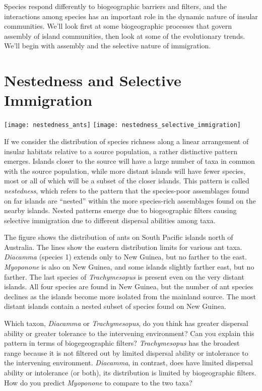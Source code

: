 \documentclass[letterpaper]{tufte-handout}
\begin{document}
Species respond differently to biogeographic barriers and filters, and the interactions among species has an important role in the dynamic nature of insular communities.  We'll look first at some biogeographic processes that govern assembly of island communities, then look at some of the evolutionary trends.  We'll begin with assembly and the selective nature of immigration.

\section{Nestedness and Selective Immigration}
\begin{marginfigure}%
	\texttt{[image: nestedness\_ants]}
	\texttt{[image: nestedness\_selective\_immigration]}
\end{marginfigure} 

If we consider the distribution of species richness along a linear arrangement of insular habitats relative to a source population, a rather distinctive pattern emerges. Islands closer to the source will have a large number of taxa in common with the source population, while more distant islands will have fewer species, most or all of which will be a subset of the closer islands. This pattern is called \textit{nestedness}, which refers to the pattern that the species-poor assemblages found on far islands are ``nested'' within the more species-rich assemblages found on the nearby islands. Nested patterns emerge due to biogeographic filters causing selective immigration due to different dispersal abilities among taxa.

The figure shows the distribution of ants on South Pacific islands north of Australia.  The lines show the eastern distribution limits for various ant taxa.  \textit{Diacamma} (species 1) extends only to New Guinea, but no farther to the east.  \textit{Myoponone} is also on New Guinea, and some islands slightly farther east, but no farther.  The last species of \textit{Trachymesopus} is present even on the very distant islands. All four species are found in New Guinea, but the number of ant species declines as the islands become more isolated from the mainland source.  The most distant islands contain a nested subset of species found on New Guinea.   

Which taxon, \textit{Diacamma} or \textit{Trachymesopus}, do you think has greater dispersal ability or greater tolerance to the intervening environment? Can you explain this pattern in terms of biogegeographic filters? \textit{Trachymesopus} has the broadest range because it is not filtered out by limited dispersal ability or intolerance to the intervening environment.  \textit{Diacamma}, in contrast, does have limited dispersal ability or intolerance (or both), its distribution is limited by biogeographic filters.  How do you predict \textit{Myoponone} to compare to the two taxa? 
\end{document}

